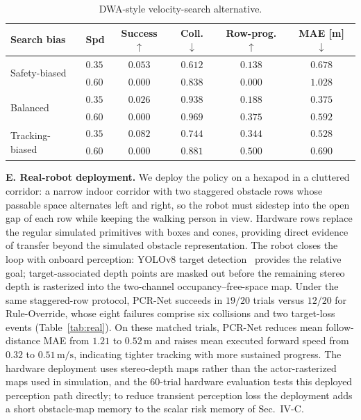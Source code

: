 \documentclass[letterpaper, 10 pt, conference]{ieeeconf}
\newcommand{\msec}{\,\mathrm{m/s}}
\begin{document}
\begin{table}[t]
\centering
\caption{DWA-style velocity-search alternative.}
\label{tab:dwa}
\setlength{\tabcolsep}{3pt}
\footnotesize
\begin{tabular}{llcccc}
\toprule
Search bias & Spd & Success $\uparrow$ & Coll. $\downarrow$ &
Row-prog. $\uparrow$ & MAE [m] $\downarrow$ \\
\midrule
\multirow{2}{*}{Safety-biased}
 & $0.35$ & $0.053$ & $0.612$ & $0.138$ & $0.678$ \\
 & $0.60$ & $0.000$ & $0.838$ & $0.000$ & $1.028$ \\
\multirow{2}{*}{Balanced}
 & $0.35$ & $0.026$ & $0.938$ & $0.188$ & $0.375$ \\
 & $0.60$ & $0.000$ & $0.969$ & $0.375$ & $0.592$ \\
\multirow{2}{*}{Tracking-biased}
 & $0.35$ & $0.082$ & $0.744$ & $0.344$ & $0.528$ \\
 & $0.60$ & $0.000$ & $0.881$ & $0.500$ & $0.690$ \\
\bottomrule
\end{tabular}
\end{table}

\textbf{E. Real-robot deployment.}
We deploy the policy on a hexapod in a cluttered corridor: a narrow indoor
corridor with two staggered obstacle rows whose passable space alternates
left and right, so the robot must sidestep into the open gap of each row
while keeping the walking person in view. Hardware rows replace the regular
simulated primitives with boxes and cones, providing direct evidence of
transfer beyond the simulated obstacle representation. The robot closes the loop with
onboard perception: YOLOv8 target detection~\cite{ref:yolo} provides the
relative goal; target-associated depth points are masked out before the
remaining stereo depth is rasterized into the two-channel
occupancy--free-space map.
Under the same staggered-row protocol, PCR-Net succeeds in $19/20$ trials
versus $12/20$ for Rule-Override, whose eight failures comprise six
collisions and two target-loss events (Table~\ref{tab:real}).
On these matched trials, PCR-Net reduces mean follow-distance MAE from $1.21$
to $0.52\,\mathrm{m}$ and raises mean executed forward speed from $0.32$ to
$0.51\msec$, indicating tighter tracking with more sustained progress.
The hardware deployment uses stereo-depth maps rather than the
actor-rasterized maps used in simulation, and the $60$-trial hardware evaluation
tests this deployed perception path directly; to reduce transient
perception loss the deployment adds a short obstacle-map memory to the
scalar risk memory of Sec.~IV-C.
\end{document}
